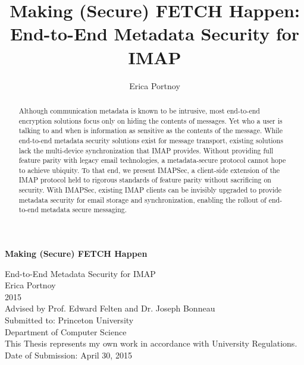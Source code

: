 \documentclass[pageno]{jpaper}
\newcommand{\project}{IMAPSec }
\newcommand{\projectnospace}{IMAPSec}
\begin{document}
\title{Making (Secure) FETCH Happen:
\\ \vspace{2 mm} {\large End-to-End Metadata Security for IMAP}}


\author{Erica Portnoy}

\date{}


\begin{titlepage}
\begin{center}

{ \huge \bfseries Making (Secure) FETCH Happen \\[0.5cm] }

{\LARGE End-to-End Metadata Security for IMAP}\\[1.5cm]

{\large Erica Portnoy\\
2015\\
Advised by Prof. Edward Felten and Dr. Joseph Bonneau\\
Submitted to: Princeton University\\
Department of Computer Science}\\[1.5cm]

{\large This Thesis represents my own work in accordance with University Regulations.}\\[6cm]

{\large Date of Submission: April 30, 2015}


\end{center}
\end{titlepage}


\thispagestyle{empty}

\vspace*{2 cm}

\begin{abstract}
Although communication metadata is known to be intrusive, most end-to-end encryption solutions focus only on hiding the contents of messages. Yet who a user is talking to and when is information as sensitive as the contents of the message. While end-to-end metadata security solutions exist for message transport, existing solutions lack the multi-device synchronization that IMAP provides. Without providing full feature parity with legacy email technologies, a metadata-secure protocol cannot hope to achieve ubiquity. To that end, we present \projectnospace, a client-side extension of the IMAP protocol held to rigorous standards of feature parity without sacrificing on security. With \projectnospace, existing IMAP clients can be invisibly upgraded to provide metadata security for email storage and synchronization, enabling the rollout of end-to-end metadata secure messaging.
\end{abstract}
\end{document}
